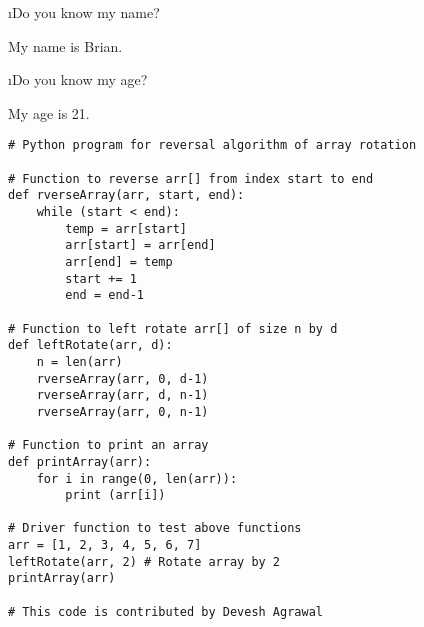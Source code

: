 \documentclass[fleqn]{article}
\begin{document}
\bee
\i Do you know my name?
\begin{tcolorbox}
My name is Brian.
\end{tcolorbox}
\i Do you know my age?
\begin{tcolorbox}
My age is 21.
\end{tcolorbox}
\begin{lstlisting}[basicstyle=\footnotesize\ttfamily, breaklines]
# Python program for reversal algorithm of array rotation
  
# Function to reverse arr[] from index start to end
def rverseArray(arr, start, end):
    while (start < end):
        temp = arr[start]
        arr[start] = arr[end]
        arr[end] = temp
        start += 1
        end = end-1
  
# Function to left rotate arr[] of size n by d
def leftRotate(arr, d):
    n = len(arr)
    rverseArray(arr, 0, d-1)
    rverseArray(arr, d, n-1)
    rverseArray(arr, 0, n-1)
  
# Function to print an array
def printArray(arr):
    for i in range(0, len(arr)):
        print (arr[i])
  
# Driver function to test above functions
arr = [1, 2, 3, 4, 5, 6, 7]
leftRotate(arr, 2) # Rotate array by 2
printArray(arr)
  
# This code is contributed by Devesh Agrawal
\end{lstlisting}
\ene
\end{document}
